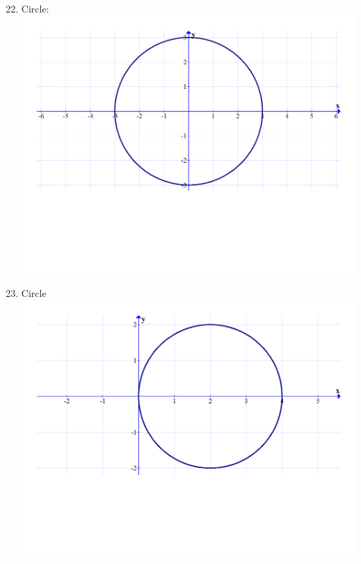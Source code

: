\documentclass[12pt]{article}
\newif\ifans
\begin{document}
\begin{enumerate}
\setcounter{enumi}{21}

\item Circle:\\
\includegraphics[scale=0.35]{graph1.pdf}

\ifans{\fbox{$r=3$}} \fi

\item Circle\\
\includegraphics[scale=0.35]{graph2.pdf}

\ifans{\fbox{$r=4\cos{\theta}$}} \fi


\end{enumerate}
\end{document}
